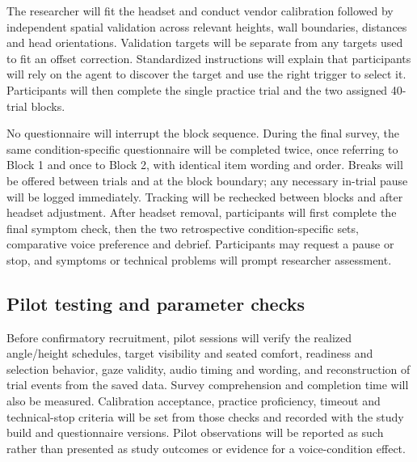 \documentclass[11pt,letterpaper]{article}
\begin{document}
The researcher will fit the headset and conduct vendor calibration followed by independent spatial validation across relevant heights, wall boundaries, distances and head orientations. Validation targets will be separate from any targets used to fit an offset correction. Standardized instructions will explain that participants will rely on the agent to discover the target and use the right trigger to select it. Participants will then complete the single practice trial and the two assigned 40-trial blocks.

No questionnaire will interrupt the block sequence. During the final survey, the same condition-specific questionnaire will be completed twice, once referring to Block 1 and once to Block 2, with identical item wording and order. Breaks will be offered between trials and at the block boundary; any necessary in-trial pause will be logged immediately. Tracking will be rechecked between blocks and after headset adjustment. After headset removal, participants will first complete the final symptom check, then the two retrospective condition-specific sets, comparative voice preference and debrief. Participants may request a pause or stop, and symptoms or technical problems will prompt researcher assessment.

\subsection{Pilot testing and parameter checks}
Before confirmatory recruitment, pilot sessions will verify the realized angle/height schedules, target visibility and seated comfort, readiness and selection behavior, gaze validity, audio timing and wording, and reconstruction of trial events from the saved data. Survey comprehension and completion time will also be measured. Calibration acceptance, practice proficiency, timeout and technical-stop criteria will be set from those checks and recorded with the study build and questionnaire versions. Pilot observations will be reported as such rather than presented as study outcomes or evidence for a voice-condition effect.
\end{document}

